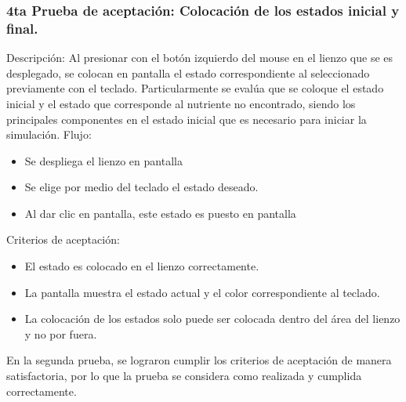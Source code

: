    \subsubsection{4ta Prueba de aceptaci\'on: Colocaci\'on de los estados inicial y final.}
    Descripci\'on: Al presionar con el bot\'on izquierdo del mouse
        en el lienzo que se es desplegado, se colocan en pantalla el
        estado correspondiente al seleccionado previamente con el
        teclado. Particularmente se eval\'ua que se coloque el estado
        inicial y el estado que corresponde al nutriente no
        encontrado, siendo los principales componentes en el estado
        inicial que es necesario para iniciar la simulaci\'on.
    \vskip 0.5cm
    Flujo:
    \begin{itemize}
        \item Se despliega el lienzo en pantalla
        \item Se elige por medio del teclado el estado deseado.
        \item Al dar clic en pantalla, este estado es puesto en pantalla
    \end{itemize}
    Criterios de aceptaci\'on:
    \begin{itemize}
        \item El estado es colocado en el lienzo correctamente.
        \item La pantalla muestra el estado actual y el color
        correspondiente al teclado.
        \item La colocaci\'on de los estados solo puede ser colocada
        dentro del \'area del lienzo y no por fuera.
    \end{itemize}
    \vskip 0.5cm
    En la segunda prueba, se lograron cumplir los criterios de
        aceptaci\'on de manera satisfactoria, por lo que la prueba se
        considera como realizada y cumplida correctamente.
    \vskip 0.5cm
